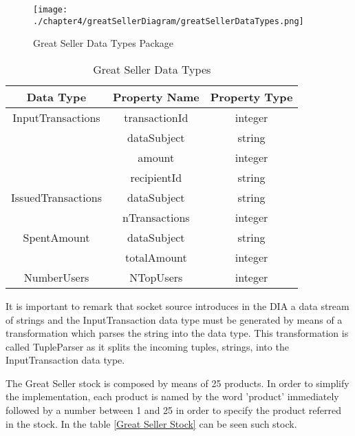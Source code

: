 \begin{figure}
\centering
{\texttt{[image: ./chapter4/greatSellerDiagram/greatSellerDataTypes.png]}}
\caption{Great Seller Data Types Package}
\label{fig:Great Seller Data Types Package}
\end{figure}

\begin{table}[h!]
\centering
	\begin{tabular}{||c|c|c||} 
	\hline\hline
	Data Type & Property Name & Property Type \\ [1ex] 
	\hline\hline
	InputTransactions & transactionId & integer  \\
	& dataSubject & string  \\
	& amount & integer  \\
	& recipientId & string  \\
	\hline
	IssuedTransactions & dataSubject & string  \\
	& nTransactions & integer \\
	\hline
	SpentAmount & dataSubject & string  \\
	& totalAmount & integer \\
	\hline
	NumberUsers & NTopUsers & integer  \\
	\hline\hline
	\end{tabular}
\caption{Great Seller Data Types}
\label{Great Seller Data Types}
\end{table}

It is important to remark that socket source introduces in the DIA a data stream of strings and the InputTransaction data type must be generated by means of a transformation which parses the string into the data type. This transformation is called TupleParser as it splits the incoming tuples, strings, into the InputTransaction data type.

The Great Seller stock is composed by means of 25 products. In order to simplify the implementation, each product is named by the word 'product' immediately followed by a number between 1 and 25 in order to specify the product referred in the stock. In the table \ref{Great Seller Stock} can be seen such stock.

